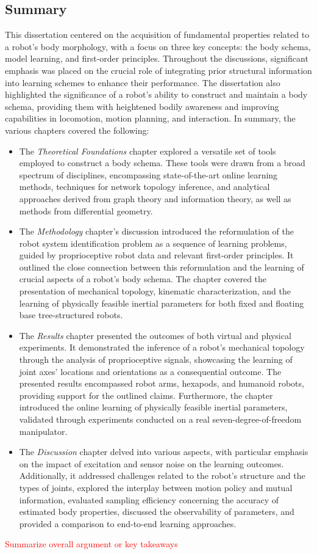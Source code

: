 \documentclass[12pt, a4paper]{article}
\newcommand{\redtext}[1]{\textcolor{red}{#1}}
\begin{document}
\subsection*{Summary}
This dissertation centered on the acquisition of fundamental properties related to a robot's body morphology, with a focus on three key concepts: the body schema, model learning, and first-order principles. Throughout the discussions, significant emphasis was placed on the crucial role of integrating prior structural information into learning schemes to enhance their performance. The dissertation also highlighted the significance of a robot's ability to construct and maintain a body schema, providing them with heightened bodily awareness and improving capabilities in locomotion, motion planning, and interaction. In summary, the various chapters covered the following:
\begin{itemize}
	\item The \textit{Theoretical Foundations} chapter explored a versatile set of tools employed to construct a body schema. These tools were drawn from a broad spectrum of disciplines, encompassing state-of-the-art online learning methods, techniques for network topology inference, and analytical approaches derived from graph theory and information theory, as well as methods from differential geometry.
	\item The \textit{Methodology} chapter's discussion introduced the reformulation of the robot system identification problem as a sequence of learning problems, guided by proprioceptive robot data and relevant first-order principles. It outlined the close connection between this reformulation and the learning of crucial aspects of a robot's body schema. The chapter covered the presentation of mechanical topology, kinematic characterization, and the learning of physically feasible inertial parameters for both fixed and floating base tree-structured robots.
	\item The \textit{Results} chapter presented the outcomes of both virtual and physical experiments. It demonstrated the inference of a robot's mechanical topology through the analysis of proprioceptive signals, showcasing the learning of joint axes' locations and orientations as a consequential outcome. The presented results encompassed robot arms, hexapods, and humanoid robots, providing support for the outlined claims. Furthermore, the chapter introduced the online learning of physically feasible inertial parameters, validated through experiments conducted on a real seven-degree-of-freedom manipulator.
	\item The \textit{Discussion} chapter delved into various aspects, with particular emphasis on the impact of excitation and sensor noise on the learning outcomes. Additionally, it addressed challenges related to the robot's structure and the types of joints, explored the interplay between motion policy and mutual information, evaluated sampling efficiency concerning the accuracy of estimated body properties, discussed the observability of parameters, and provided a comparison to end-to-end learning approaches.
\end{itemize}
\redtext{Summarize overall argument or key takeaways}
\end{document}
